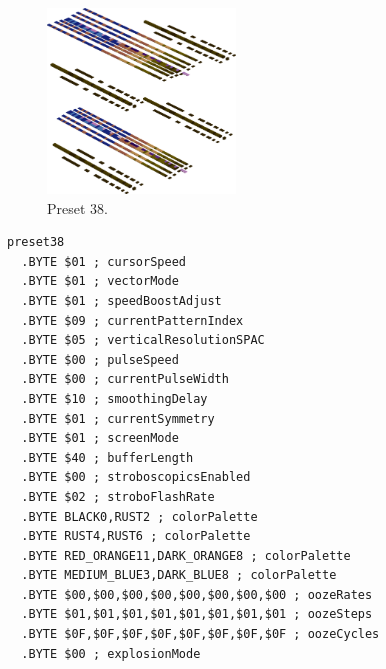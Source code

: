 \vspace*{0.5cm}
\begin{minipage}[b]{0.48\linewidth}
\begin{figure}[H]                                                          
  \centering                                                             
  \begin{adjustbox}{width=5cm,center}                                   
  \includegraphics[width=5cm]{src/colorspace_presets/preset38-45.png}%
  \end{adjustbox}                                                        
\caption*{Preset 38.}                                           
\end{figure}                                                               
\end{minipage}
\hspace{0.1cm}
\begin{minipage}[b]{0.48\linewidth}                                                                         
\begin{lstlisting}[basicstyle=\ttfamily\tiny]
preset38
  .BYTE $01 ; cursorSpeed
  .BYTE $01 ; vectorMode
  .BYTE $01 ; speedBoostAdjust
  .BYTE $09 ; currentPatternIndex
  .BYTE $05 ; verticalResolutionSPAC
  .BYTE $00 ; pulseSpeed
  .BYTE $00 ; currentPulseWidth
  .BYTE $10 ; smoothingDelay
  .BYTE $01 ; currentSymmetry
  .BYTE $01 ; screenMode
  .BYTE $40 ; bufferLength
  .BYTE $00 ; stroboscopicsEnabled
  .BYTE $02 ; stroboFlashRate
  .BYTE BLACK0,RUST2 ; colorPalette
  .BYTE RUST4,RUST6 ; colorPalette
  .BYTE RED_ORANGE11,DARK_ORANGE8 ; colorPalette
  .BYTE MEDIUM_BLUE3,DARK_BLUE8 ; colorPalette
  .BYTE $00,$00,$00,$00,$00,$00,$00,$00 ; oozeRates
  .BYTE $01,$01,$01,$01,$01,$01,$01,$01 ; oozeSteps
  .BYTE $0F,$0F,$0F,$0F,$0F,$0F,$0F,$0F ; oozeCycles
  .BYTE $00 ; explosionMode
\end{lstlisting}
\end{minipage}


